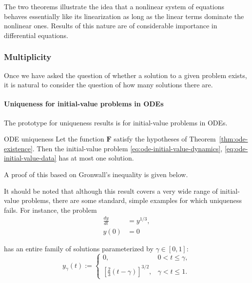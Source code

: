 The two theorems illustrate the idea that a nonlinear system of equations behaves essentially like its linearization as long as the linear terms dominate the nonlinear ones. Results of this nature are of considerable importance in differential equations.

\subsubsection{Multiplicity}\label{subsec:multiplicity}

Once we have asked the question of whether a solution to a given problem exists, it is natural to consider the question of how many solutions there are.

\paragraph*{Uniqueness for initial-value problems in ODEs}

The prototype for uniqueness results is for initial-value problems in ODEs.

\begin{Theorem}{ODE uniqueness}
\label{thm:ode-uniqueness}
Let the function $\mathbf{F}$ satisfy the hypotheses of Theorem~\ref{thm:ode-existence}. Then the initial-value problem \eqref{eq:ode-initial-value-dynamics}, \eqref{eq:ode-initial-value-data} has at most one solution.
\end{Theorem}

A proof of this based on Gronwall's inequality is given below.

It should be noted that although this result covers a very wide range of initial-value problems, there are some standard, simple examples for which uniqueness fails. For instance, the problem
\[
\begin{aligned}
\frac{dy}{dt}&=y^{1/3},\\
y(0)&=0
\end{aligned}
\]

has an entire family of solutions parameterized by $\gamma\in[0,1]$:
\[
y_\gamma(t):=\begin{cases}
0,&0<t\leq\gamma,\\
\left[\frac{2}{3}(t-\gamma)\right]^{3/2},&\gamma<t\leq1.
\end{cases}
\]
